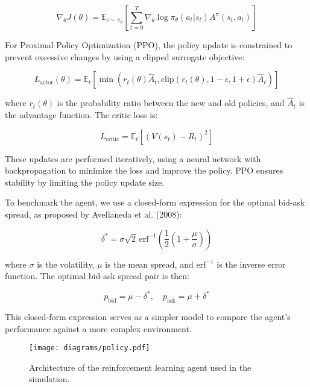 \documentclass[11pt]{article}
\begin{document}
    \[
        \nabla_\theta J(\theta) = \mathbb{E}_{\tau \sim \pi_\theta} \left[ \sum_{t=0}^{T} \nabla_\theta \log \pi_\theta(a_t | s_t) A^\pi(s_t, a_t) \right]
    \]

    For Proximal Policy Optimization (PPO), the policy update is constrained to prevent excessive changes by using a clipped surrogate objective:

    \[
        L_{\text{actor}}(\theta) = \mathbb{E}_t \left[ \min \left( r_t(\theta) \hat{A}_t, \text{clip}(r_t(\theta), 1-\epsilon, 1+\epsilon) \hat{A}_t \right) \right]
    \]

    where \( r_t(\theta) \) is the probability ratio between the new and old policies, and \( \hat{A}_t \) is the advantage function.
    The critic loss is:

    \[
        L_{\text{critic}} = \mathbb{E}_t \left[ (V(s_t) - R_t)^2 \right]
    \]

    These updates are performed iteratively, using a neural network with backpropagation to minimize the loss and improve the policy.
    PPO ensures stability by limiting the policy update size.

    To benchmark the agent, we use a closed-form expression for the optimal bid-ask spread, as proposed by Avellaneda et al. (2008):

    \[
        \delta^* = \sigma \sqrt{2} \, \text{erf}^{-1} \left( \frac{1}{2} \left( 1 + \frac{\mu}{\sigma} \right) \right)
    \]

    where \( \sigma \) is the volatility, \( \mu \) is the mean spread, and \( \text{erf}^{-1} \) is the inverse error function.
    The optimal bid-ask spread pair is then:

    \[
        p_{\text{bid}} = \mu - \delta^*, \quad p_{\text{ask}} = \mu + \delta^*
    \]

    This closed-form expression serves as a simpler model to compare the agent's performance against a more complex environment.

    \begin{figure}[htb]
        \centering
        \texttt{[image: diagrams/policy.pdf]}
        \caption{Architecture of the reinforcement learning agent used in the simulation.}
        \label{fig:agent}
    \end{figure}
\end{document}
